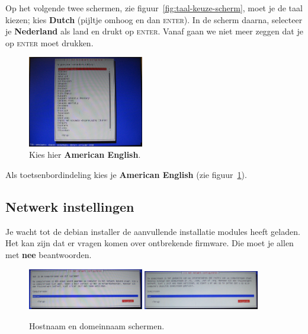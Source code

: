 \documentclass[12pt,a4paper]{article}
\begin{document}
Op het volgende twee schermen, zie figuur~\ref{fig:taal-keuze-scherm},  moet je de taal kiezen; kies \textbf{Dutch} (pijltje omhoog en dan \textsc{enter}). In de scherm daarna, selecteer je  \textbf{Nederland} als land en drukt op \textsc{enter}. Vanaf gaan we niet meer zeggen dat je op \textsc{enter} moet drukken.

\begin{figure}[H]
\centering
\includegraphics[width=0.45\textwidth]{toetsenbord-indeling-scherm}
\caption{Kies hier \textbf{American English}.}
\label{fig:toetsenbord-indeling-scherm}
\end{figure}

Als toetsenbordindeling kies je \textbf{American English} (zie figuur~\ref{fig:toetsenbord-indeling-scherm}).


\subsection{Netwerk instellingen}
Je wacht tot de debian installer de aanvullende installatie modules heeft geladen. Het kan zijn dat er vragen komen over ontbrekende firmware. Die moet je allen met \textbf{nee} beantwoorden.

\begin{figure}[H]
\centering
\includegraphics[width=0.45\textwidth]{computernaam-scherm}
\includegraphics[width=0.45\textwidth]{domeinnaam-scherm}
\caption{Hostnaam en domeinnaam schermen.}
\label{fig:computernaam-scherm}
\end{figure}
\end{document}
